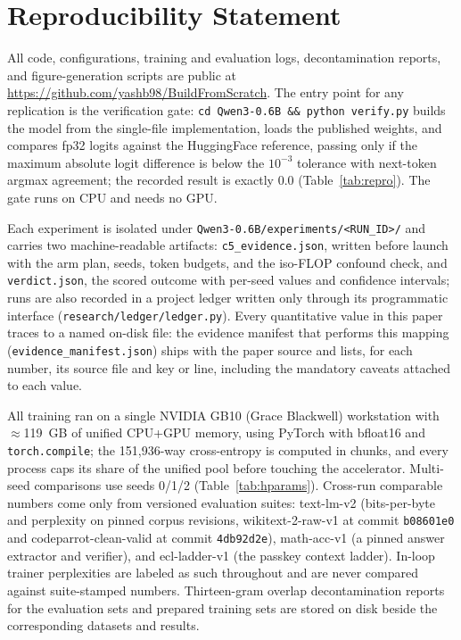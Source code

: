 \section{Reproducibility Statement}\label{sec:repro-statement}

All code, configurations, training and evaluation logs, decontamination
reports, and figure-generation scripts are public at
\url{https://github.com/yashb98/BuildFromScratch}. The entry point for any
replication is the verification gate: \texttt{cd Qwen3-0.6B \&\& python
verify.py} builds the model from the single-file implementation, loads the
published weights, and compares fp32 logits against the HuggingFace reference,
passing only if the maximum absolute logit difference is below the $10^{-3}$
tolerance with next-token argmax agreement; the recorded result is exactly
$0.0$ (Table~\ref{tab:repro}). The gate runs on CPU and needs no GPU.

Each experiment is isolated under
\texttt{Qwen3-0.6B/experiments/<RUN\_ID>/} and carries two machine-readable
artifacts: \texttt{c5\_evidence.json}, written before launch with the arm
plan, seeds, token budgets, and the iso-FLOP confound check, and
\texttt{verdict.json}, the scored outcome with per-seed values and confidence
intervals; runs are also recorded in a project ledger written only through
its programmatic interface (\texttt{research/ledger/ledger.py}). Every
quantitative value in this paper traces to a named on-disk file: the evidence
manifest that performs this mapping (\texttt{evidence\_manifest.json}) ships
with the paper source and lists, for each number, its source file and key or
line, including the mandatory caveats attached to each value.

All training ran on a single NVIDIA GB10 (Grace Blackwell) workstation with
$\approx$119~GB of unified CPU+GPU memory, using PyTorch with bfloat16 and
\texttt{torch.compile}; the 151,936-way cross-entropy is computed in chunks,
and every process caps its share of the unified pool before touching the
accelerator. Multi-seed comparisons use seeds 0/1/2
(Table~\ref{tab:hparams}). Cross-run comparable numbers come only from
versioned evaluation suites: text-lm-v2 (bits-per-byte and perplexity on
pinned corpus revisions, wikitext-2-raw-v1 at commit \texttt{b08601e0} and
codeparrot-clean-valid at commit \texttt{4db92d2e}), math-acc-v1 (a pinned
answer extractor and verifier), and ecl-ladder-v1 (the passkey context
ladder). In-loop trainer perplexities are labeled as such throughout and are
never compared against suite-stamped numbers. Thirteen-gram overlap
decontamination reports for the evaluation sets and prepared training sets
are stored on disk beside the corresponding datasets and results.
